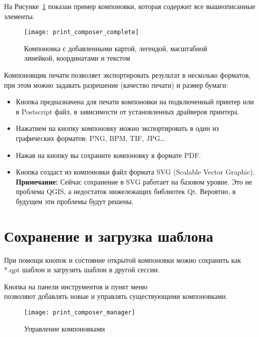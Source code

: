 На Рисунке~\ref{fig:print_composer_complete} показан пример компоновки,
которая содержит все вышеописанные элементы.

\begin{figure}[h]
   \centering
   \texttt{[image: print\_composer\_complete]}
   \caption{Компоновка с добавленными картой, легендой, масштабной линейкой, координатами и текстом \nixcaption} \label{fig:print_composer_complete}
\end{figure}

Компоновщик печати позволяет экспортировать результат в несколько
форматов, при этом можно задавать разрешение (качество печати) и размер
бумаги:

\begin{itemize}[label=--]
\item Кнопка  предназначена для
печати компоновки на подключенный принтер или в Postscript файл, в
зависимости от установленных драйверов принтера.
\item Нажатием на кнопку
компоновку можно экспортировать в один из графических форматов: PNG,
BPM, TIF, JPG\dots
\item Нажав на кнопку  вы
сохраните компоновку в формате PDF.
\item Кнопка  создаст из
компоновки файл формата SVG (Scalable Vector Graphic).
\textbf{Примечание:} Сейчас сохранение в SVG работает на базовом уровне.
Это не проблема QGIS, а недостаток нижележащих библиотек Qt. Вероятно,
в будущем эти проблемы будут решены.
\end{itemize}

\section{Сохранение и загрузка шаблона}

При помощи кнопок 
и  состояние открытой
компоновки можно сохранить как *.qpt шаблон и загрузить шаблон в другой
сессии.

Кнопка 
на панели инструментов и пункт меню \\
 \arrow {}
позволяют добавлять новые и управлять существующими компоновками.

\begin{figure}[h]
   \centering
   \texttt{[image: print\_composer\_manager]}
   \caption{Управление компоновками \nixcaption}
   \label{fig:print_composer_manager}
\end{figure}

\FloatBarrier
